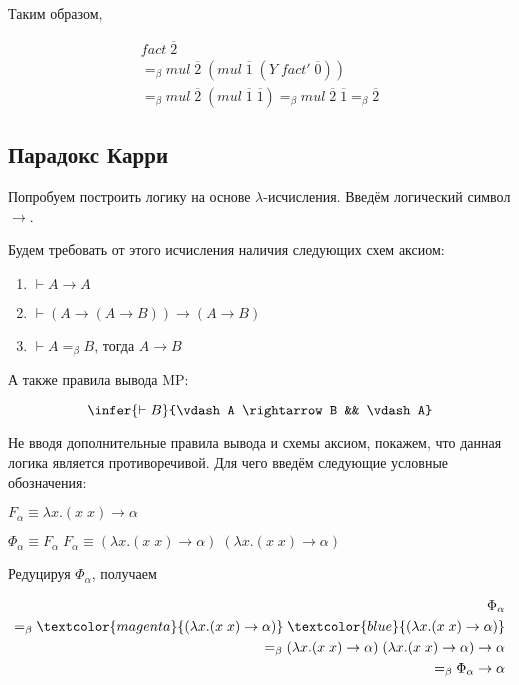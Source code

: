 Таким образом,

\begin{align*}
	fact \; \overline{2} \\ =_{\beta} mul \; \overline{2} \; (mul \; \overline{1} \; (Y \; fact' \; \overline{0})) \\=_{\beta} mul \; \overline{2} \; (mul \; \overline{1} \; \overline{1}) =_{\beta} mul \; \overline{2} \; \overline{1} =_{\beta} \overline{2}
\end{align*}

\subsection{Парадокс Карри}

Попробуем построить логику на основе $\lambda$-исчисления. Введём логический символ $\rightarrow$. 

Будем требовать от этого исчисления наличия следующих схем аксиом:

\begin{enumerate}
	\item $\vdash A \rightarrow A$
	\item $\vdash (A \rightarrow (A \rightarrow B)) \rightarrow (A \rightarrow B)$
	\item $\vdash A =_{\beta} B$, тогда $A \rightarrow B$
\end{enumerate}

А также правила вывода MP:

$$\infer{\vdash B}{\vdash A \rightarrow B && \vdash A}$$

Не вводя дополнительные правила вывода и схемы аксиом, покажем, что данная логика является противоречивой. Для чего введём следующие условные обозначения:

$F_{\alpha} \equiv \lambda x. (x \; x) \rightarrow \alpha$

$\Phi_{\alpha} \equiv F_{\alpha}  \; F_{\alpha}  \equiv (\lambda x. (x \; x) \rightarrow \alpha) \; (\lambda x. (x \; x) \rightarrow \alpha)$

Редуцируя $\Phi_{\alpha}$, получаем 

\begin{align*}
\Phi_{\alpha} \\ =_{\beta} \textcolor{magenta}{(\lambda x. (x \; x) \rightarrow \alpha)} \; \textcolor{blue}{(\lambda x. (x \; x) \rightarrow \alpha)} \\=_{\beta} (\lambda x. (x \; x) \rightarrow \alpha) \; (\lambda x. (x \; x) \rightarrow \alpha) \rightarrow \alpha \\=_{\beta} \Phi_{\alpha} \rightarrow \alpha
\end{align*}

